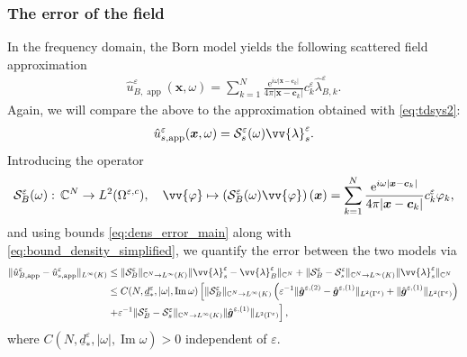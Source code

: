 \documentclass[]{article}
\numberwithin{equation}{section}
\numberwithin{theorem}{section}
\numberwithin{lemma}{section}
\numberwithin{corollary}{section}
\numberwithin{proposition}{section}
\numberwithin{definition}{section}
\newcommand{\bx}{\boldsymbol{x}}
\newcommand{\bc}{\boldsymbol{c}}
\newcommand{\re}{\varepsilon}
\renewcommand{\vec}{\boldsymbol}
\renewcommand{\Im}{\operatorname{Im}}
\begin{document}
\begin{appendices}
		\subsubsection*{The error of the field}
		In the frequency domain, the Born model yields the following scattered field approximation
		\begin{align}
			\label{eq:born}
			\hat{u}^{\re}_{B,\operatorname{app}}(\bx,\omega)=\sum\limits_{k=1}^N\frac{\mathrm{e}^{i\omega|\bx-\bc_k|}}{4\pi|\bx-\bc_k|}c_k^{\re}\hat{\lambda}_{B,k}^{\re}.
		\end{align}
		Again, we will compare the above to the approximation obtained with \eqref{eq:tdsys2}:
		\begin{align*}%
			\hat{u}^{\re}_{s,\operatorname{app}}(\bx,\omega)=\mathcal{S}^{\re}_s(\omega)\vv{\lambda}_s^{\re}.
		\end{align*}
		Introducing the operator 
		\begin{align*}%
			\mathcal{S}^{\re}_{B}(\omega): \, \mathbb{C}^N\rightarrow L^2(\Omega^{\re,c}), \quad \vv{\varphi}\mapsto 	\left(\mathcal{S}^{\re}_{B}(\omega)\vv{\varphi}\right)(\vec{x})=\sum\limits_{k=1}^N\frac{\mathrm{e}^{i\omega|\bx-\bc_k|}}{4\pi|\bx-\bc_k|}c_k^{\re}\varphi_k, 
		\end{align*}
		and using bounds \eqref{eq:dens_error_main} along with \eqref{eq:bound_density_simplified}, we quantify the error between the two models via 
		\begin{align}
			\label{eq:dens_err}
			\begin{split}
				\|	\hat{u}^{\re}_{B,\operatorname{app}} - \hat{u}^{\re}_{s,\operatorname{app}}\|_{L^{\infty}(K)} &\leq 
				\|\mathcal{S}^{\re}_B\|_{\mathbb{C}^N\rightarrow L^{\infty}(K)} \|\vv{\lambda}_s^{\re}-\vv{\lambda}_B^{\re}\|_{\mathbb{C}^N}+\|\mathcal{S}^{\re}_B-\mathcal{S}^{\re}_s\|_{\mathbb{C}^N\rightarrow L^{\infty}(K)}\|\vv{\lambda}_s^{\re}\|_{\mathbb{C}^N} \\
				&\leq C(N, \underline{d}_*^{\re},|\omega|, \Im \omega) \left[ \|\mathcal{S}^{\re}_B\|_{\mathbb{C}^N\rightarrow L^{\infty}(K)} \left(\re^{-1}\|	\hat{\vec{g}}^{\re,(2)}-	\hat{\vec{g}}^{\re,(1)}\|_{L^2(\Gamma^{\re})}+ \|	\hat{\vec{g}}^{\re,(1)}\|_{L^2(\Gamma^{\re})}\right) \right.\\
				&\left.+ \re^{-1} \|\mathcal{S}^{\re}_B-\mathcal{S}^{\re}_s\|_{\mathbb{C}^N\rightarrow L^{\infty}(K)} \|\hat{\vec{g}}^{\re,(1)}\|_{L^2(\Gamma^{\re})} \right],
			\end{split}
			\end{align} 
			where $C(N, \underline{d}_*^{\re},|\omega|, \Im \omega)>0$ independent of $\re$.

\end{appendices}
\end{document}
